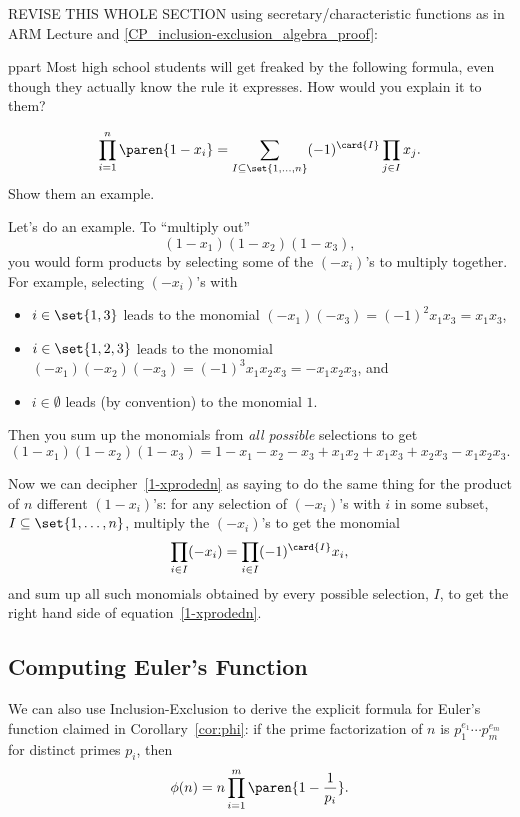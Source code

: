 \begin{editingnotes}
REVISE THIS WHOLE SECTION using secretary/characteristic functions as in ARM
Lecture and \ref{CP_inclusion-exclusion_algebra_proof}:

ppart Most high school students will get freaked by the following formula,
even though they actually know the rule it expresses.  How would you
explain it to them?

\begin{equation}\label{1-xprodedn}
\prod_{i=1}^n \paren{1-x_i} = \sum_{I \subseteq \set{1,\dots,n}} (-1)^{\card{I}}\prod_{j \in I}x_j.
\end{equation}
\hint Show them an example.

\begin{solution}
Let's do an example.  To ``multiply out''
\begin{equation}%
(1-x_1)(1-x_2)(1-x_3),
\end{equation}
you would form \emph{} products by selecting some of the
$(-x_i)$'s to multiply together.  For example, selecting $(-x_i)$'s with
\begin{itemize}
\item $i \in \set{1,3}$ leads to the monomial $(-x_1)(-x_3) = (-1)^2x_1x_3
  = x_1x_3$,
\item $i \in \set{1,2,3}$ leads to the monomial $(-x_1)(-x_2)(-x_3)= (-1)^3x_1x_2x_3 = -x_1x_2x_3$, and
\item $i \in \emptyset$ leads (by convention) to the monomial $1$.
\end{itemize}
Then you sum up the monomials from \emph{all possible} selections to get
\[
(1-x_1)(1-x_2)(1-x_3) = 1 - x_1 - x_2 - x_3 + x_1x_2 + x_1x_3 + x_2x_3 - x_1x_2x_3.
\]

Now we can decipher~\eqref{1-xprodedn} as saying to do the same thing for
the product of $n$ different $(1-x_i)$'s:  for any selection of $(-x_i)$'s
with $i$ in some subset, $I \subseteq \set{1,\dots,n}$, multiply the
$(-x_i)$'s to get the monomial
\[
\prod_{i \in I} (-x_i) = \prod_{i \in I} (-1)^{\card{I}} x_i,
\]
and sum up all such monomials obtained by every possible selection, $I$,
to get the right hand side of equation~\eqref{1-xprodedn}.
\end{solution}

\end{editingnotes}

\subsection{Computing Euler's Function}
We can also use Inclusion-Exclusion to derive the explicit
formula for Euler's function claimed in Corollary~\ref{cor:phi}:
if the prime factorization of $n$ is $p_1^{e_1}\cdots p_m^{e_m}$
for distinct primes $p_i$, then
\begin{equation}\label{inex-phi}
\phi(n) = n \prod_{i=1}^m \paren{1-\frac{1}{p_i}}.
\end{equation}

